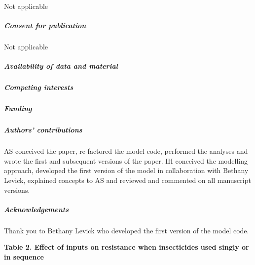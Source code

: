 \documentclass[11pt,]{article}
\let\oldsubparagraph\subparagraph
\renewcommand{\subparagraph}[1]{\oldsubparagraph{#1}\mbox{}}
\begin{document}
Not applicable

\subparagraph{Consent for publication}\label{consent-for-publication}

Not applicable

\subparagraph{Availability of data and
material}\label{availability-of-data-and-material}

\subparagraph{Competing interests}\label{competing-interests}

\subparagraph{Funding}\label{funding}

\subparagraph{Authors' contributions}\label{authors-contributions}

AS conceived the paper, re-factored the model code, performed the
analyses and wrote the first and subsequent versions of the paper. IH
conceived the modelling approach, developed the first version of the
model in collaboration with Bethany Levick, explained concepts to AS and
reviewed and commented on all manuscript versions.

\subparagraph{Acknowledgements}\label{acknowledgements}

Thank you to Bethany Levick who developed the first version of the model
code.

\pagebreak

\textbf{Table 2. Effect of inputs on resistance when insecticides used
singly or in sequence}
\end{document}
